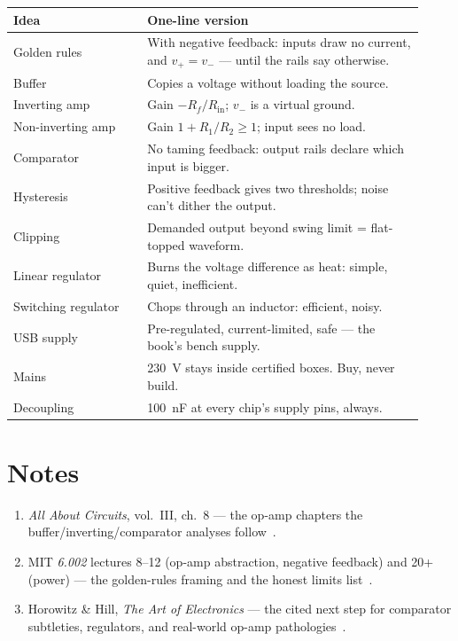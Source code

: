 \begin{center}
\small
\begin{tabular}{@{}p{0.30\linewidth}p{0.62\linewidth}@{}}
\toprule
\textbf{Idea} & \textbf{One-line version} \\ \midrule
Golden rules & With negative feedback: inputs draw no current, and $v_+ = v_-$ — until the rails say otherwise. \\
Buffer & Copies a voltage without loading the source. \\
Inverting amp & Gain $-R_f/R_{\mathrm{in}}$; $v_-$ is a virtual ground. \\
Non-inverting amp & Gain $1 + R_1/R_2 \ge 1$; input sees no load. \\
Comparator & No taming feedback: output rails declare which input is bigger. \\
Hysteresis & Positive feedback gives two thresholds; noise can't dither the output. \\
Clipping & Demanded output beyond swing limit = flat-topped waveform. \\
Linear regulator & Burns the voltage difference as heat: simple, quiet, inefficient. \\
Switching regulator & Chops through an inductor: efficient, noisy. \\
USB supply & Pre-regulated, current-limited, safe — the book's bench supply. \\
Mains & \qty{230}{\volt} stays inside certified boxes. Buy, never build. \\
Decoupling & \qty{100}{\nano\farad} at every chip's supply pins, always. \\
\bottomrule
\end{tabular}
\end{center}

\section*{Notes}
\begin{enumerate}
\item \emph{All About Circuits}, vol.\ III, ch.\ 8 — the op-amp chapters
the buffer/inverting/comparator analyses follow~\cite{aacvol3}.
\item MIT \emph{6.002} lectures 8--12 (op-amp abstraction, negative
feedback) and 20+ (power) — the golden-rules framing and the honest
limits list~\cite{ocw6002}.
\item Horowitz \& Hill, \emph{The Art of Electronics} — the cited next
step for comparator subtleties, regulators, and real-world
op-amp pathologies~\cite{aoe}.
\end{enumerate}

